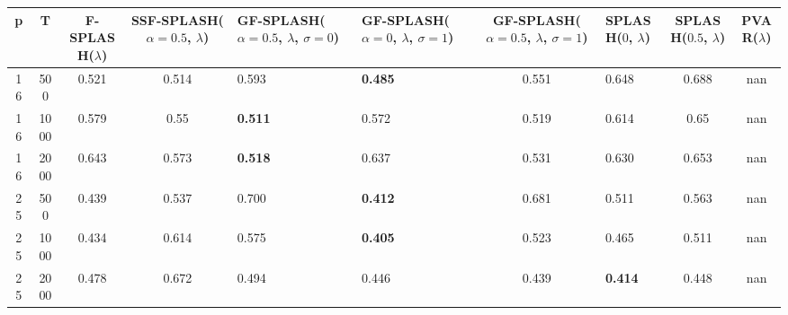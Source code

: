 \begin{tabular}{ccccllclcc}
\hline
  p  &  T   &  F-SPLASH($\lambda$)  &  SSF-SPLASH($\alpha=0.5$, $\lambda$)  & GF-SPLASH($\alpha=0.5$, $\lambda$, $\sigma=0$)   & GF-SPLASH($\alpha=0$, $\lambda$, $\sigma=1$)   &  GF-SPLASH($\alpha=0.5$, $\lambda$, $\sigma=1$)  & SPLASH($0$, $\lambda$)   &  SPLASH($0.5$, $\lambda$)  &  PVAR($\lambda$)  \\
\hline
 16  & 500  &         0.521         &                 0.514                 & 0.593                                            & \textbf{0.485}                                 &                      0.551                       & 0.648                    &           0.688            &        nan        \\
 16  & 1000 &         0.579         &                 0.55                  & \textbf{0.511}                                   & 0.572                                          &                      0.519                       & 0.614                    &            0.65            &        nan        \\
 16  & 2000 &         0.643         &                 0.573                 & \textbf{0.518}                                   & 0.637                                          &                      0.531                       & 0.630                    &           0.653            &        nan        \\
 25  & 500  &         0.439         &                 0.537                 & 0.700                                            & \textbf{0.412}                                 &                      0.681                       & 0.511                    &           0.563            &        nan        \\
 25  & 1000 &         0.434         &                 0.614                 & 0.575                                            & \textbf{0.405}                                 &                      0.523                       & 0.465                    &           0.511            &        nan        \\
 25  & 2000 &         0.478         &                 0.672                 & 0.494                                            & 0.446                                          &                      0.439                       & \textbf{0.414}           &           0.448            &        nan        \\
\hline
\end{tabular}
